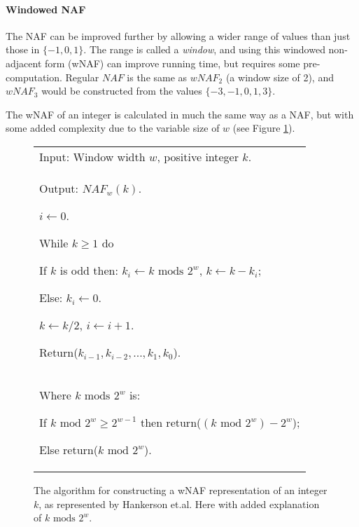 \paragraph{Windowed NAF}

The NAF can be improved further by allowing a wider range of values than just those in \(\{-1,0,1\}\). The range is called a \emph{window}, and
using this windowed non-adjacent form (wNAF) can improve running time, but requires some pre-computation. Regular \(NAF\) is the same
as \(wNAF_2\) (a window size of 2), and \(wNAF_3\) would be constructed from the values \(\{-3,-1,0,1,3\}\).

The wNAF of an integer is calculated in much the same way as a NAF, but with some added complexity due to the variable size of \(w\)
(see Figure \ref{fig:compute-wnaf-algorithm}).

\begin{figure}[htb!]
	\begin{tabular}{|p{\textwidth}|}
		\hline
		Input: Window width \(w\), positive integer \(k\). \\
		Output: \(NAF_w(k)\).
		\begin{enumerate*}
			\item \(i \gets 0\).
			\item While \(k \geq 1\) do
			\begin{enumerate*}
				\item If \(k\) is odd then: \(k_i \gets k \text{ mods } 2^w\), \(k \gets k - k_i\);
				\item Else: \(k_i \gets 0\).
				\item \(k \gets k/2\), \(i \gets i + 1\).
			\end{enumerate*}
			\item Return(\(k_{i-1},k_{i-2},...,k_1,k_0\)).
		\end{enumerate*} \\
		\hline
		Where \(k \text{ mods } 2^w\) is: 
		\begin{enumerate*}
			\item If \(k \text{ mod } 2^w \geq 2^{w-1}\) then return(\((k \text{ mod } 2^w) - 2^w\));
			\item Else return(\(k \text{ mod } 2^w\)).
		\end{enumerate*} \\
		\hline
	\end{tabular}
	\caption{The algorithm for constructing a wNAF representation of an integer \(k\), as represented by Hankerson
		et.al.\cite{hankerson2010} Here with added explanation of \(k \text{ mods } 2^w\).}
	\label{fig:compute-wnaf-algorithm}
\end{figure}


